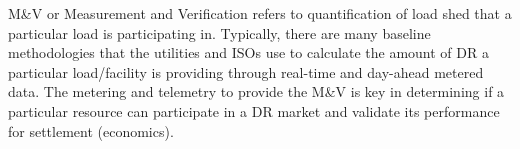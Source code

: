 M{\&}V or Measurement and Verification refers to quantification of load shed
that a particular load is participating in. Typically, there are many
baseline methodologies that the utilities and ISOs use to calculate the
amount of DR a particular load/facility is providing through real-time and
day-ahead metered data. The metering and telemetry to provide the M{\&}V is
key in determining if a particular resource can participate in a DR market 
and validate its performance for settlement (economics).

